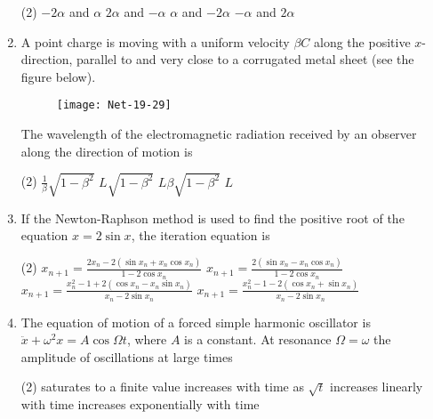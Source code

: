 \begin{enumerate}
 \begin{tasks}(2)
	\task[\textbf{a.}]$-2 \alpha$ and $\alpha$
	\task[\textbf{b.}] $2 \alpha$ and $-\alpha$
	\task[\textbf{c.}] $\alpha$ and $-2 \alpha$
	\task[\textbf{d.}] $-\alpha$ and $2 \alpha$
\end{tasks}
\item  A point charge is moving with a uniform velocity $\beta C$ along the positive $x$-direction, parallel to and very close to a corrugated metal sheet (see the figure below).
\begin{figure}[H]
	\centering
	\texttt{[image: Net-19-29]}
\end{figure}
The wavelength of the electromagnetic radiation received by an observer along the direction of motion is
 \begin{tasks}(2)
	\task[\textbf{a.}]$\frac{1}{\beta} \sqrt{1-\beta^{2}}$
	\task[\textbf{b.}]$L \sqrt{1-\beta^{2}}$
	\task[\textbf{c.}]$L \beta \sqrt{1-\beta^{2}}$
	\task[\textbf{d.}] $L$
\end{tasks}
\item If the Newton-Raphson method is used to find the positive root of the equation $x=2 \sin x$, the iteration equation is
 \begin{tasks}(2)
	\task[\textbf{a.}]$x_{n+1}=\frac{2 x_{n}-2\left(\sin x_{n}+x_{n} \cos x_{n}\right)}{1-2 \cos x_{n}}$
	\task[\textbf{b.}]$x_{n+1}=\frac{2\left(\sin x_{n}-x_{n} \cos x_{n}\right)}{1-2 \cos x_{n}}$
	\task[\textbf{c.}] $x_{n+1}=\frac{x_{n}^{2}-1+2\left(\cos x_{n}-x_{n} \sin x_{n}\right)}{x_{n}-2 \sin x_{n}}$
	\task[\textbf{d.}]  $x_{n+1}=\frac{x_{n}^{2}-1-2\left(\cos x_{n}+\sin x_{n}\right)}{x_{n}-2 \sin x_{n}}$
\end{tasks}
\item  The equation of motion of a forced simple harmonic oscillator is $\ddot{x}+\omega^{2} x=A \cos \Omega t$, where $A$ is a constant. At resonance $\Omega=\omega$ the amplitude of oscillations at large times
 \begin{tasks}(2)
	\task[\textbf{a.}]saturates to a finite value
	\task[\textbf{b.}] increases with time as $\sqrt{t}$
	\task[\textbf{c.}] increases linearly with time
	\task[\textbf{d.}]  increases exponentially with time
\end{tasks}

\end{enumerate}
